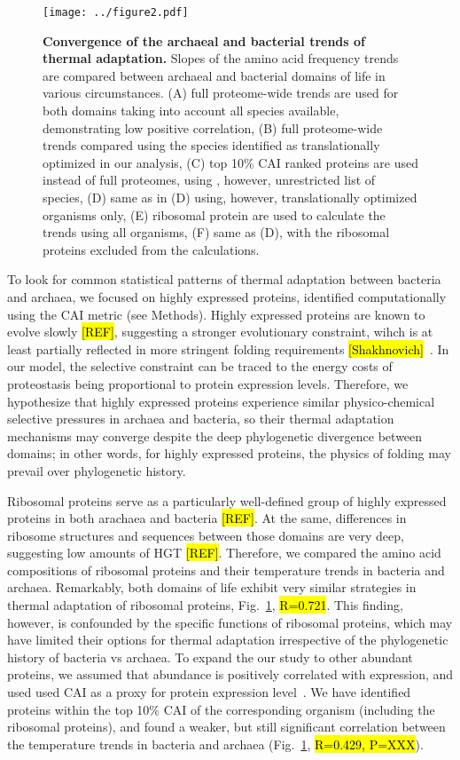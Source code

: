 \documentclass[10pt,letterpaper]{article}
\begin{document}
\begin{figure}[h!]
\texttt{[image: ../figure2.pdf]}
\caption{
{\bf Convergence of the archaeal and bacterial trends of thermal adaptation.} Slopes of the amino acid frequency trends are compared between archaeal and bacterial domains of life in various circumstances.
(A) full proteome-wide trends are used for both domains taking into account all species available, demonstrating low positive correlation,
(B) full proteome-wide trends compared using the species identified as translationally optimized in our analysis,
(C) top 10\% CAI ranked proteins are used instead of full proteomes, using , however, unrestricted list of species,
(D) same as in (D) using, however, translationally optimized organisms only,
(E) ribosomal protein are used to calculate the trends using all organisms,
(F) same as (D), with the ribosomal proteins excluded from the calculations.
}
\label{fig:fig2}
\end{figure}



To look for common statistical patterns of thermal adaptation between bacteria and archaea, we focused on highly expressed proteins, identified computationally using the CAI metric (see Methods).  Highly expressed proteins are known to evolve slowly \hl{[REF]}, suggesting a stronger evolutionary constraint, wihch is at least partially reflected in more stringent folding requirements \hl{[Shakhnovich]}~\cite{Drummond2008MistranslationInduced}. In our model, the selective constraint can be traced to the energy costs of proteostasis being proportional to protein expression levels. Therefore, we hypothesize that highly expressed proteins experience similar physico-chemical selective pressures in archaea and bacteria, so their thermal adaptation mechanisms may converge despite the deep phylogenetic divergence between domains; in other words, for highly expressed proteins, the physics of folding may prevail over phylogenetic history.

Ribosomal proteins serve as a particularly well-defined group of highly expressed proteins in both arachaea and bacteria \hl{[REF]}. At the same, differences in ribosome structures and sequences between those domains are very deep, suggesting low amounts of HGT \hl{[REF]}. Therefore, we compared the amino acid compositions  of ribosomal proteins and their temperature trends in bacteria and archaea. Remarkably, both domains of life exhibit very similar strategies in thermal adaptation of ribosomal proteins, Fig.~\ref{fig:fig2}, \hl{R=0.721}. This finding, however, is confounded by the specific functions of ribosomal proteins, which may have limited their options for thermal adaptation irrespective of the phylogenetic history of bacteria vs archaea. To expand the our study to other abundant proteins, we assumed that abundance is positively correlated with expression, and used used CAI as a proxy for protein expression level~\cite{Jansen2003Revisiting}. We have identified proteins within the top 10\% CAI of the corresponding organism (including the ribosomal proteins), and found a weaker, but still significant correlation between the temperature trends in bacteria and archaea (Fig.~\ref{fig:fig2}, \hl{R=0.429, P=XXX}). 
\end{document}
